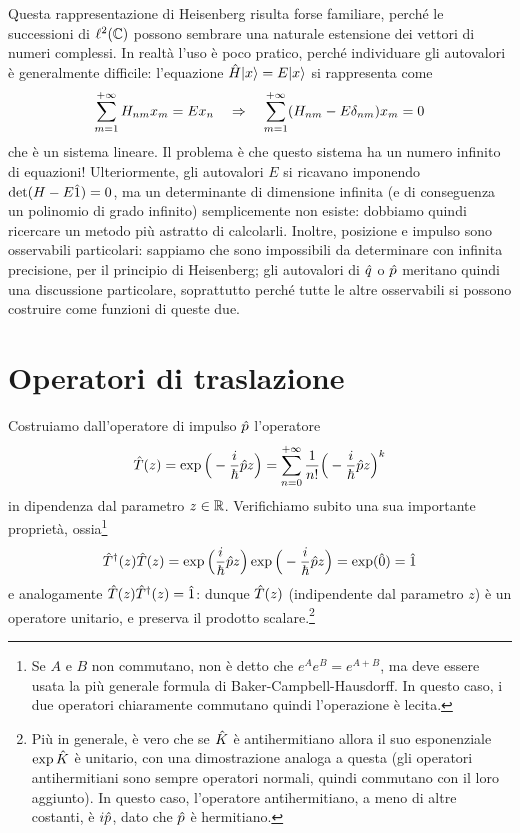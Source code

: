 Questa rappresentazione di Heisenberg risulta forse familiare, perch\'e le successioni di $\ell^2(\mathbb{C})$ possono sembrare una naturale estensione dei vettori di numeri complessi.
In realtà l'uso è poco pratico, perch\'e individuare gli autovalori è generalmente difficile: l'equazione $\hat{H}\lvert x\rangle=E\lvert x\rangle$ si rappresenta come
\begin{equation}
	\sum_{m=1}^{+\infty}H_{nm}x_m=Ex_n\quad\Rightarrow\quad\sum_{m=1}^{+\infty}(H_{nm}-E\delta_{nm})x_m=0
\end{equation}
che è un sistema lineare.
Il problema è che questo sistema ha un numero infinito di equazioni!
Ulteriormente, gli autovalori $E$ si ricavano imponendo $\det(H-E\hat{1})=0$, ma un determinante di dimensione infinita (e di conseguenza un polinomio di grado infinito) semplicemente non esiste: dobbiamo quindi ricercare un metodo più astratto di calcolarli.
Inoltre, posizione e impulso sono osservabili particolari: sappiamo che sono impossibili da determinare con infinita precisione, per il principio di Heisenberg; gli autovalori di $\hat{q}$ o $\hat{p}$ meritano quindi una discussione particolare, soprattutto perch\'e tutte le altre osservabili si possono costruire come funzioni di queste due.

\section{Operatori di traslazione}
Costruiamo dall'operatore di impulso $\hat{p}$ l'operatore
\begin{equation}
	\hat{T}(z)=\exp\Big(-\frac{i}{\hbar}\hat{p} z\Big)=\sum_{n=0}^{+\infty}\frac1{n!}\Big(-\frac{i}{\hbar}\hat{p} z\Big)^k
	\label{eq:operatore-traslazione}
\end{equation}
in dipendenza dal parametro $z\in\mathbb{R}$.
Verifichiamo subito una sua importante proprietà, ossia\footnote{Se $A$ e $B$ non commutano, non è detto che $e^Ae^B=e^{A+B}$, ma deve essere usata la più generale formula di Baker-Campbell-Hausdorff. In questo caso, i due operatori chiaramente commutano quindi l'operazione è lecita.}
\begin{equation}
	\hat{T}^\dagger(z)\hat{T}(z)=\exp\Big(\frac{i}{\hbar}\hat{p}z\Big)\exp\Big(-\frac{i}{\hbar}\hat{p}z\Big)=\exp(\hat{0})=\hat{1}
	\label{eq:unitarieta-traslazione}
\end{equation}
e analogamente $\hat{T}(z)\hat{T}^\dagger(z)=\hat{1}$: dunque $\hat{T}(z)$ (indipendente dal parametro $z$) è un operatore unitario, e preserva il prodotto scalare.\footnote{Più in generale, è vero che se $\hat{K}$ è antihermitiano allora il suo esponenziale $\exp\hat{K}$ è unitario, con una dimostrazione analoga a questa (gli operatori antihermitiani sono sempre operatori normali, quindi commutano con il loro aggiunto). In questo caso, l'operatore antihermitiano, a meno di altre costanti, è $i\hat{p}$, dato che $\hat{p}$ è hermitiano.} 

